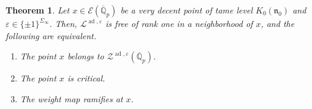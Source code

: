 \documentclass[10pt, twoside]{amsart}
\theoremstyle{plain}
\newtheorem{theorem}{Theorem}
\theoremstyle{definition}
\theoremstyle{remark}
\numberwithin{equation}{subsection}
\def\ad{\operatorname{ad}}
\def\gn{\mathfrak n}
\def\scre{\mathscr E}
\def\scrl{\mathscr L}
\def\scrz{\mathscr{Z}}
\def\qpbar{\overline{\mathbb Q}_p}
\begin{document}
\begin{theorem}\label{thm:ramification}
Let $x  \in \scre(\qpbar)$ be a very decent point of tame level $K_0(\gn_0)$ and $\varepsilon \in \{\pm 1\}^{\Sigma_\infty}$. Then, $\scrl^{\ad,\varepsilon}$ is free of rank one in a neighborhood of $x$, and the following are equivalent.
\begin{enumerate}[label=(\roman*)]
\item The point $x$ belongs to $\scrz^{\ad,\varepsilon}(\qpbar)$.\label{thm-part:ramification-zero}
\item The point $x$ is critical.\label{thm-part:ramification-critical}
\item The weight map ramifies at $x$.\label{thm-part:ramification-ramify}
\end{enumerate}
\end{theorem}
\end{document}

